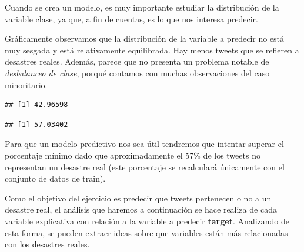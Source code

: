 \documentclass[]{article}
\newenvironment{Shaded}{\begin{snugshade}}{\end{snugshade}}
\newcommand{\DecValTok}[1]{\textcolor[rgb]{0.00,0.00,0.81}{#1}}
\newcommand{\KeywordTok}[1]{\textcolor[rgb]{0.13,0.29,0.53}{\textbf{#1}}}
\newcommand{\NormalTok}[1]{#1}
\newcommand{\OperatorTok}[1]{\textcolor[rgb]{0.81,0.36,0.00}{\textbf{#1}}}
\newcommand{\StringTok}[1]{\textcolor[rgb]{0.31,0.60,0.02}{#1}}
\begin{document}
Cuando se crea un modelo, es muy importante estudiar la distribución de
la variable clase, ya que, a fin de cuentas, es lo que nos interesa
predecir.

Gráficamente observamos que la distribución de la variable a predecir no
está muy sesgada y está relativamente equilibrada. Hay menos tweets que
se refieren a desastres reales. Además, parece que no presenta un
problema notable de \emph{desbalanceo de clase}, porqué contamos con
muchas observaciones del caso minoritario.

\begin{Shaded}
\end{Shaded}

\begin{verbatim}
## [1] 42.96598
\end{verbatim}

\begin{Shaded}
\end{Shaded}

\begin{verbatim}
## [1] 57.03402
\end{verbatim}

Para que un modelo predictivo nos sea útil tendremos que intentar
superar el porcentaje mínimo dado que aproximadamente el 57\% de los
tweets no representan un desastre real (este porcentaje se recalculará
únicamente con el conjunto de datos de train).

Como el objetivo del ejercicio es predecir que tweets pertenecen o no a
un desastre real, el análisis que haremos a continuación se hace realiza
de cada variable explicativa con relación a la variable a predecir
\textbf{target}. Analizando de esta forma, se pueden extraer ideas sobre
que variables están más relacionadas con los desastres reales.
\end{document}
